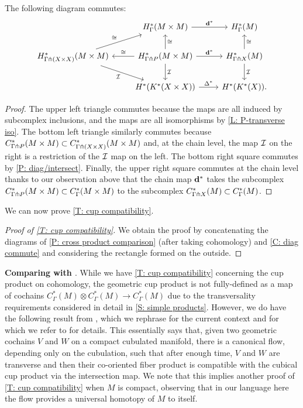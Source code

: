 \begin{corollary}\label{C: diag commute}
	The following diagram commutes:
	\[
	\begin{tikzcd}
		&H^*_{\Gamma}(M \times M) \arrow[r,"\diag^*"]& H^*_{\Gamma}(M) \\
	H^*_{\Gamma \pf (X \times X)}(M \times M)  \arrow[rd,"\mc I"']\arrow[ru,"\cong"] & \arrow[l,"\cong"']H^*_{\Gamma \pf P}(M \times M) \arrow[r,"\diag^*"] \arrow[d,"\mc I"] \arrow[u,"\cong"']& H^*_{\Gamma \pf X}(M) \arrow[d,"\mc I"] \arrow[u,"\cong"'] \\
		&H^*(K^*(X\times X))	\arrow[r,"\Delta^*"] & H^*(K^*(X)) .
	\end{tikzcd}
	\]
\end{corollary}
\begin{proof}
	The upper left triangle commutes because the maps are all induced by subcomplex inclusions, and the maps are all isomorphisms by \cref{L: P-transverse iso}.
	The bottom left triangle similarly commutes because $C^*_{\Gamma \pitchfork P}(M \times M) \subset C^*_{\Gamma \pitchfork (X \times X)}(M \times M)$ and, at the chain level, the map $\mathcal{I}$ on the right is a restriction of the $\mathcal{I}$ map on the left.
	The bottom right square commutes by \cref{P: diag/intersect}.
	Finally, the upper right square commutes at the chain level thanks to our observation above that the chain map $\mathbf{d}^*$ takes the subcomplex $C^*_{\Gamma \pitchfork P}(M \times M) \subset C^*_\Gamma(M \times M)$ to the subcomplex $C^*_{\Gamma \pitchfork X}(M) \subset C^*_\Gamma(M)$.
\end{proof}

We can now prove \cref{T: cup compatibility}.

\begin{proof}[Proof of \cref{T: cup compatibility}]
We obtain the proof by concatenating the diagrams of \cref{P: cross product comparison} (after taking cohomology) and \cref{C: diag commute} and considering the rectangle formed on the outside.
\end{proof}

\medskip

\noindent\textbf{Comparing with \cite{FMS-flows}}.
While we have \cref{T: cup compatibility} concerning the cup product on cohomology, the geometric cup product is not fully-defined as a map of cochains $C^*_\Gamma(M) \otimes C^*_\Gamma(M) \to C^*_\Gamma(M)$ due to the transversality requirements considered in detail in \cref{S: simple products}.
However, we do have the following result from \cite{FMS-flows}, which we rephrase for the current context and for which we refer to \cite{FMS-flows} for details.
This essentially says that, given two geometric cochains $V$ and $W$ on a compact cubulated manifold, there is a canonical flow, depending only on the cubulation, such that after enough time, $V$ and $W$ are transverse and then their co-oriented fiber product is compatible with the cubical cup product via the intersection map.
We note that this implies another proof of \cref{T: cup compatibility} when $M$ is compact, observing that in our language here the flow provides a universal homotopy of $M$ to itself.

